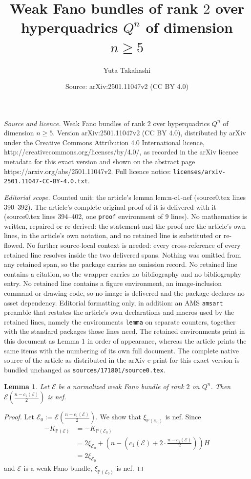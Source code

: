 \documentclass[10pt,a4paper]{amsart}
\title{Weak Fano bundles of rank $2$ over hyperquadrics $Q^n$ of dimension $n \ge 5$}
\author{Yuta Takahashi}
\date{Source: arXiv:2501.11047v2 (CC BY 4.0)}
\newtheorem{lemma}{Lemma}
\def\P{{\mathbb P}}
\def\cE{{\mathcal E}}
\begin{document}
\maketitle

\noindent\emph{Source and licence.} Weak Fano bundles of rank $2$ over hyperquadrics $Q^n$ of dimension $n \ge 5$. Version arXiv:2501.11047v2 (CC BY 4.0), distributed by arXiv under the Creative Commons Attribution 4.0 International licence, http://creativecommons.org/licenses/by/4.0/, as recorded in the arXiv licence metadata for this exact version and shown on the abstract page https://arxiv.org/abs/2501.11047v2. Full licence notice: \texttt{licenses/arxiv-2501.11047-CC-BY-4.0.txt}.\par\smallskip

\noindent\textit{Editorial scope.} Counted unit: the article's lemma lem:n-c1-nef (source0.tex lines 390--392). The article's complete original proof of it is delivered with it (source0.tex lines 394--402, one \texttt{proof} environment of 9 lines). No mathematics is written, repaired or re-derived: the statement and the proof are the article's own lines, in the article's own notation, and no retained line is substituted or re-flowed.  No further source-local context is needed: every cross-reference of every retained line resolves inside the two delivered spans.  Nothing was omitted from any retained span, so the package carries no omission record.  No retained line contains a citation, so the wrapper carries no bibliography and no bibliography entry.  No retained line contains a figure environment, an image-inclusion command or drawing code, so no image is delivered and the package declares no asset dependency.  Editorial formatting only, in addition: an AMS \texttt{amsart} preamble that restates the article's own declarations and macros used by the retained lines, namely the environments \texttt{lemma} on separate counters, together with the standard packages those lines need.  The retained environments print in this document as Lemma 1 in order of appearance, whereas the article prints the same items with the numbering of its own full document.  The complete native source of the article as distributed in the arXiv e-print for this exact version is bundled unchanged as \texttt{sources/171801/source0.tex}.
\begin{lemma}\label{lem:n-c1-nef}
Let $\cE$ be a normalized weak Fano bundle of rank $2$ on $Q^n$. Then $\cE\left(\frac{n-c_1(\cE)}{2}\right)$ is nef.
\end{lemma}

\begin{proof}
Let $\cE_0:= \cE\left(\frac{n-c_1(\cE)}{2}\right)$. We show that $\xi_{\mathbb{P}(\cE_0)}$ is nef. Since 
\begin{align*}
-K_{\mathbb{P}(\cE)}&=-K_{\mathbb{P}\left(\cE_0\right)}\\
&= 2\xi_{\cE_0}+\left(n-\left(c_1(\cE)+2\cdot \frac{n-c_1(\cE)}{2}\right)\right)H\\
&= 2\xi_{\cE_0}
\end{align*}
and $\cE$ is a weak Fano bundle, $\xi_{\P\left(\cE_0\right)}$ is nef.
\end{proof}
\end{document}
